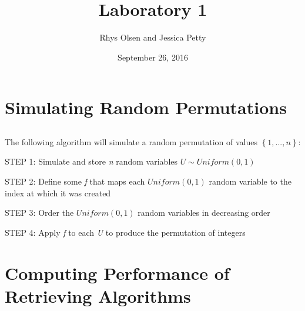 \documentclass[11pt, oneside]{article}   	%
\title{Laboratory 1}
\author{Rhys Olsen and Jessica Petty}
\date{September 26, 2016}
\begin{document}
\maketitle
\section{Simulating Random Permutations}
\subsection{}

The following algorithm will simulate a random permutation of values $\left\{1,..., n \right\}$:

STEP 1: Simulate and store \textit{n} random variables $U\sim Uniform(0,1)$

STEP 2: Define some \textit{f} that maps each $Uniform\left(0,1 \right)$ random variable to the index at which it was created

STEP 3: Order the $ Uniform\left(0,1 \right)$ random variables in decreasing order

STEP 4: Apply \textit{f} to each \textit{U} to produce the permutation of integers

\subsection{}
\subsection{}
\subsection{}
\subsection{}

\section{Computing Performance of Retrieving Algorithms}
\subsection{}
\subsection{}
\subsection{}
\subsection{}
\subsection{}
\end{document}
